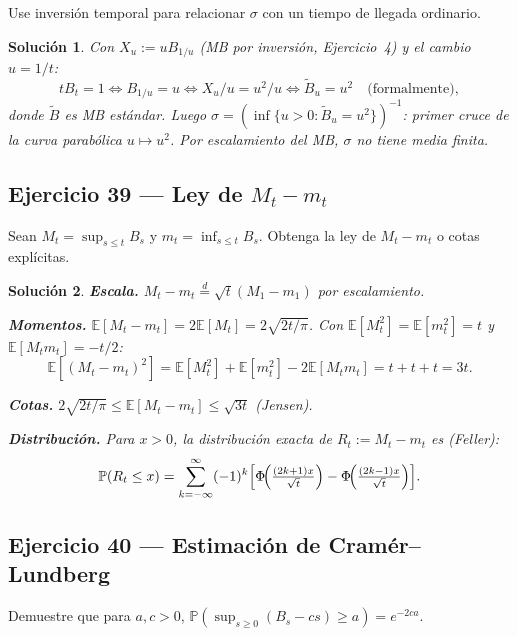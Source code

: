 \documentclass[12pt,letterpaper]{article}
\theoremstyle{ejercicio}
\theoremstyle{solucion}
\newtheorem*{solucion}{Solución}
\newcommand{\E}{\mathbb{E}}
\newcommand{\dto}{\overset{d}{=}}
\renewcommand{\P}{\mathbb{P}}
\begin{document}
\begin{recuadro}
Use inversión temporal para relacionar $\sigma$ con un tiempo de llegada ordinario.
\end{recuadro}

\begin{solucion}
Con $X_u:=uB_{1/u}$ (MB por inversión, Ejercicio~4) y el cambio $u=1/t$:
\[
  tB_t=1\iff B_{1/u}=u\iff X_u/u=u^2/u\iff \tilde B_u=u^2\quad\text{(formalmente)},
\]
donde $\tilde B$ es MB estándar. Luego
$\sigma=(\inf\{u>0:\tilde B_u=u^2\})^{-1}$: primer cruce de la curva parabólica $u\mapsto u^2$.
Por escalamiento del MB, $\sigma$ no tiene media finita.
\end{solucion}

\subsection*{Ejercicio 39 — Ley de $M_t-m_t$}

\begin{recuadro}
Sean $M_t=\sup_{s\le t}B_s$ y $m_t=\inf_{s\le t}B_s$. Obtenga la ley de $M_t-m_t$
o cotas explícitas.
\end{recuadro}

\begin{solucion}
\textbf{Escala.} $M_t-m_t\dto\sqrt{t}(M_1-m_1)$ por escalamiento.

\textbf{Momentos.} $\E[M_t-m_t]=2\E[M_t]=2\sqrt{2t/\pi}$.
Con $\E[M_t^2]=\E[m_t^2]=t$ y $\E[M_t m_t]=-t/2$:
\[
  \E[(M_t-m_t)^2]=\E[M_t^2]+\E[m_t^2]-2\E[M_t m_t]=t+t+t=3t.
\]

\textbf{Cotas.} $2\sqrt{2t/\pi}\le\E[M_t-m_t]\le\sqrt{3t}$ (Jensen).

\textbf{Distribución.} Para $x>0$, la distribución exacta de $R_t:=M_t-m_t$ es (Feller):
\[
  \P(R_t\le x)=\sum_{k=-\infty}^{\infty}(-1)^k\Bigl[\Phi\!\Bigl(\tfrac{(2k+1)x}{\sqrt{t}}\Bigr)
  -\Phi\!\Bigl(\tfrac{(2k-1)x}{\sqrt{t}}\Bigr)\Bigr].
\]
\end{solucion}

\subsection*{Ejercicio 40 — Estimación de Cramér–Lundberg}

\begin{recuadro}
Demuestre que para $a,c>0$,
$\P(\sup_{s\ge 0}(B_s-cs)\ge a)=e^{-2ca}$.
\end{recuadro}
\end{document}

